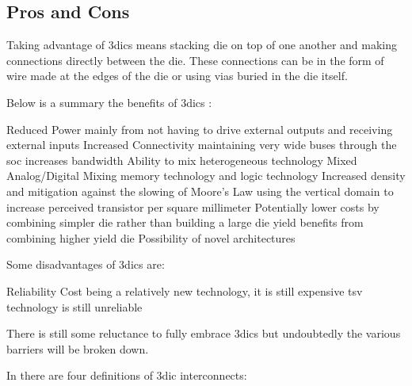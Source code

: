 \subsection{Pros and Cons}
\label{sec:3dic benefits}

Taking advantage of \acp{3dic} means stacking die on top of one another and making connections directly between the die. These connections can be in the form of wire made at the edges of the die or using vias buried in the die itself.


Below is a summary the benefits of \acp{3dic} :
\begin{outline}
  \1 Reduced Power
    \2 mainly from not having to drive external outputs and receiving external inputs
  \1 Increased Connectivity
    \2 maintaining very wide buses through the \ac{soc} increases bandwidth
  \1 Ability to mix heterogeneous technology
    \2 Mixed Analog/Digital
    \2 Mixing memory technology and logic technology
  \1 Increased density and mitigation against the slowing of Moore's Law
    \2 using the vertical domain to increase perceived transistor per square millimeter
  \1 Potentially lower costs by combining simpler die rather than building a large die
    \2 yield benefits from combining higher yield die
  \1 Possibility of novel architectures \cite{Kim2016}
\end{outline}

Some disadvantages of \acp{3dic} are:
\begin{outline}
  \1 Reliability
  \1 Cost
    \2 being a relatively new technology, it is still expensive 
    \2 \ac{tsv} technology is still unreliable
\end{outline}

There is still some reluctance to fully embrace \acp{3dic} but undoubtedly the various barriers will be broken down.
\iffalse
The ability to mix technology targeted toward \ac{dram} with \acs{cmos} is something of which this work takes advantage.
\fi

In \cite{itrs2015_interconn} there are four definitions of \ac{3dic} interconnects:

